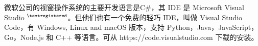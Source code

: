 \documentclass[main.tex]{subfiles}
\begin{document}
	



微软公司的视窗操作系统的主要开发语言是C\#，其 IDE 是 Microsoft Visual Studio ${}^{\textregistered}$。但他们也有一个免费的轻巧 IDE，叫做 Visual Studio Code，有 Windows, Linux and macOS 版本，支持 Python，Java，JavaScript，Go，Node.js 和 C++ 等语言。可从
https://code.visualstudio.com
下载的安装。
\end{document}

